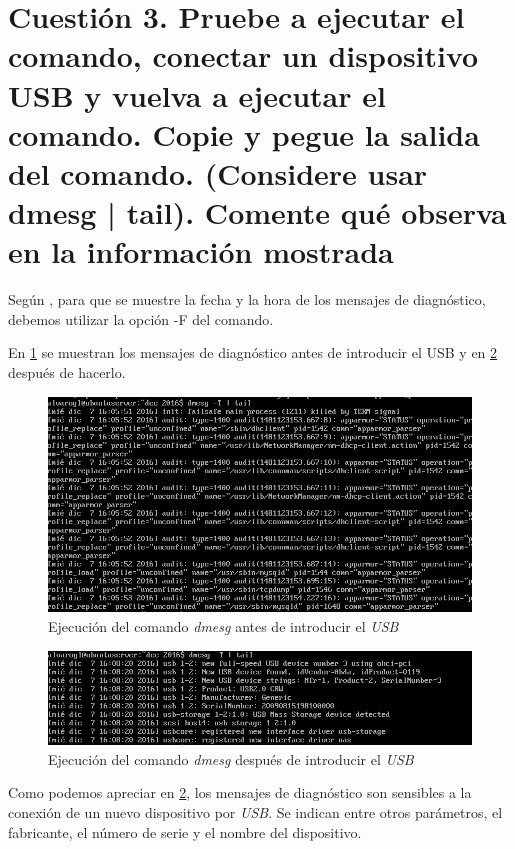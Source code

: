 \section{Cuestión 3. Pruebe a ejecutar el comando, conectar un dispositivo USB y vuelva a ejecutar el comando. Copie y pegue la salida del comando. (Considere usar dmesg | tail). Comente qué observa en la información mostrada}

Según \cite{dmesg}, para que se muestre la fecha y la hora de los mensajes de diagnóstico, debemos utilizar la opción -F del comando.

En \ref{cuestion3-usb} se muestran los mensajes de diagnóstico antes de introducir el USB y en \ref{cuestion3-usb2} después de hacerlo.

\begin{figure}[H]
	\centering
	\includegraphics[scale=0.6]{cuestion3-usb.png}
	\caption{Ejecución del comando \textit{dmesg} antes de introducir el \textit{USB}} \label{cuestion3-usb}
\end{figure}

\begin{figure}[H]
	\centering
	\includegraphics[scale=0.6]{cuestion3-usb2.png}
	\caption{Ejecución del comando \textit{dmesg} después de introducir el \textit{USB}} \label{cuestion3-usb2}
\end{figure}

Como podemos apreciar en \ref{cuestion3-usb2}, los mensajes de diagnóstico son sensibles a la conexión de un nuevo dispositivo por \textit{USB}.  Se indican entre otros parámetros, el fabricante, el número de serie y el nombre del dispositivo.

